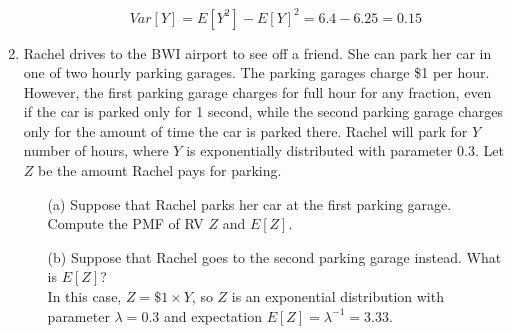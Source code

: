 \documentclass{report}
\begin{document}
\begin{enumerate}
\begin{itemize}
$$ Var[Y] = E[Y^2] - E[Y]^2 = 6.4-6.25 = 0.15 $$
\end{itemize}
\item Rachel drives to the BWI airport to see off a friend. She can park her car in one of two hourly
parking garages. The parking garages charge \$1 per hour. However, the first parking garage charges
for full hour for any fraction, even if the car is parked only for 1 second, while the second parking
garage charges only for the amount of time the car is parked there. Rachel will park for $Y$ number of
hours, where $Y$ is exponentially distributed with parameter 0.3. Let $Z$ be the amount Rachel pays for
parking.
\begin{itemize}
    \item[(a)] Suppose that Rachel parks her car at the first parking garage. Compute the PMF of RV $Z$ and $E[Z]$.
\item[(b)] Suppose that Rachel goes to the second parking garage instead. What is $E[Z]$?\\
In this case, $Z = \$ 1 \times Y$, so $Z$ is an exponential distribution with parameter $ \lambda = 0.3$ and expectation $E[Z] = \lambda^{-1} = 3.33$.

\end{itemize}












\end{enumerate}
 
\end{document}
